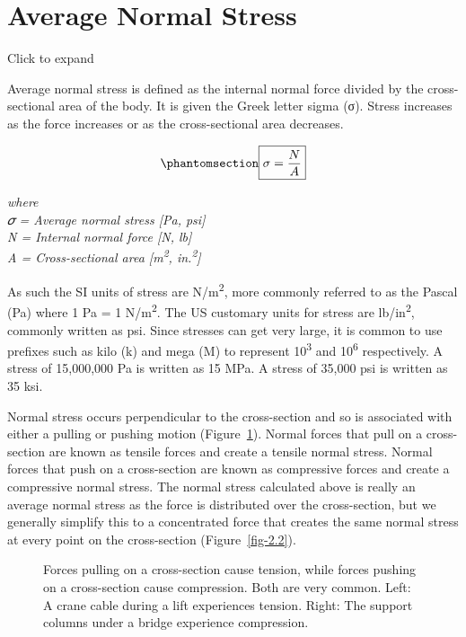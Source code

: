 \documentclass[
  letterpaper,
  DIV=11,
  numbers=noendperiod]{scrreprt}
\theoremstyle{definition}
\theoremstyle{remark}
\begin{document}
\section{Average Normal Stress}\label{sec-2.1}

Click to expand

Average normal stress is defined as the internal normal force divided by
the cross-sectional area of the body. It is given the Greek letter sigma
(σ). Stress increases as the force increases or as the cross-sectional
area decreases.

\begin{equation}\phantomsection\label{eq-2.1}{
\boxed
{\sigma=\frac{N}{A}}
}\end{equation}

\emph{where}\\
\emph{𝜎 = Average normal stress {[}Pa, psi{]}}\\
\emph{N = Internal normal force {[}N, lb{]}}\\
\emph{A = Cross-sectional area {[}m\textsuperscript{2},
in.\textsuperscript{2}{]}}

As such the SI units of stress are N/m\textsuperscript{2}, more commonly
referred to as the Pascal (Pa) where 1 Pa = 1 N/m\textsuperscript{2}.
The US customary units for stress are lb/in\textsuperscript{2}, commonly
written as psi. Since stresses can get very large, it is common to use
prefixes such as kilo (k) and mega (M) to represent
10\textsuperscript{3} and 10\textsuperscript{6} respectively. A stress
of 15,000,000 Pa is written as 15 MPa. A stress of 35,000 psi is written
as 35 ksi.

Normal stress occurs perpendicular to the cross-section and so is
associated with either a pulling or pushing motion
(Figure~\ref{fig-2.1}). Normal forces that pull on a cross-section are
known as tensile forces and create a tensile normal stress. Normal
forces that push on a cross-section are known as compressive forces and
create a compressive normal stress. The normal stress calculated above
is really an average normal stress as the force is distributed over the
cross-section, but we generally simplify this to a concentrated force
that creates the same normal stress at every point on the cross-section
(Figure~\ref{fig-2.2}).

\begin{figure}


\caption{\label{fig-2.1}Forces pulling on a cross-section cause tension,
while forces pushing on a cross-section cause compression. Both are very
common. Left: A crane cable during a lift experiences tension. Right:
The support columns under a bridge experience compression.}

\end{figure}%
\end{document}
